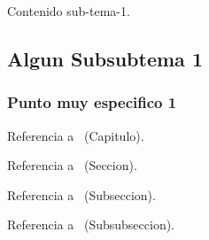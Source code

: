 Contenido sub-tema-1.

\subsection{Algun Subsubtema 1}\label{lbl-subsubtemauno}

\subsubsection{Punto muy especifico 1}\label{lbl-profundouno}

Referencia a \temados\ (Capitulo).

Referencia a \subtemados\ (Seccion).

Referencia a \subsubtemados\ (Subseccion).

Referencia a \profundodos\ (Subsubseccion).
